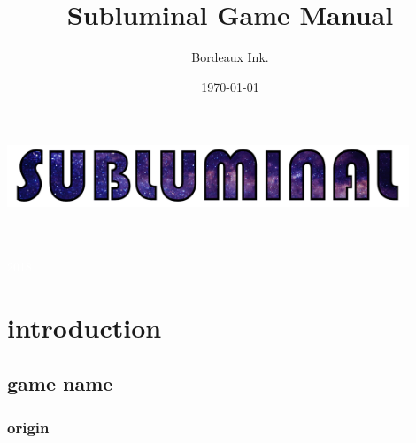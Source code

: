 \documentclass[a5paper,pagesize,10pt,bibliograhpy=totoc,numbers=noenddot,
,twoside=false]{scrbook}
\title{Subluminal \- Game Manual}
\author{Bordeaux Ink.}
\date{\today}
\begin{document}
\begin{titlepage}
    \pagecolor[rgb]{0.1,0.1,0.1}
    \vspace{\fill}
    \begin{vbox}
    \includegraphics[width=0.9\textwidth]{logo.png}
    \end{vbox}
		\vspace{5mm}
    \centering{\huge{\textcolor{white}{by Bordeaux Ink.}}}\\
    \vspace{\fill}
    \\
		\vspace{\fill}
		\centering \Large{\textcolor{white}{2018}}
\end{titlepage}
\pagecolor[rgb]{1,1,1}
\newpage{}
\chapter{introduction}
\lipsum[5]
\section*{game name}
\lipsum[10]
\subsection*{origin}
\lipsum[10]

\end{document}
